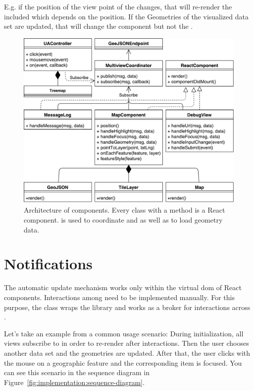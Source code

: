 E.g. if the position of the view point of the  changes, that will re-render the included  which depends on the position.
If the Geometries of the visualized data set are updated, that will change the  component but not the .

\begin{figure}[ht]
  \centering
  \includegraphics[width=\textwidth]{figures/implementation/Architecture.pdf}
  \caption{%
    Architecture of components.
    Every class with a  method is a React component.
     is used to coordinate \tmap{} and \gv{} as well as to load geometry data.
  }\label{fig:implementation:architecture}
\end{figure}

\section{Notifications}

The automatic update mechanism works only within the virtual \gls{dom} of React components.
Interactions among \cmvs{} need to be implemented manually.
For this purpose, the class  wraps the library  and works as a broker for interactions across \cmvs{}.

Let's take an example from a common usage scenario:
During initialization, all views subscribe to  in order to re-render after interactions.
Then the user chooses another data set and the geometries are updated.
After that, the user clicks with the mouse on a geographic feature and the corresponding item is focused.
You can see this scenario in the sequence diagram in Figure~\ref{fig:implementation:sequence-diagram}.

